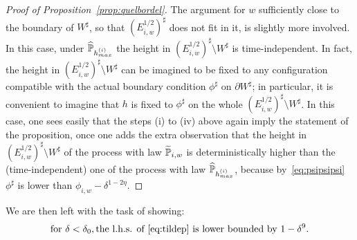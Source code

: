 \documentclass[10pt]{amsart}
\theoremstyle{definition}\newtheorem{defi}[theo]{Definition}\newtheorem{rema}[theo]{Remark}\newtheorem{exam}[theo]{Example}\newtheorem{exem}[theo]{Example}\newtheorem{nota}[theo]{Notation}
\renewcommand{\P}{\mathbb{P}}
\renewcommand{\d}{{\sharp }}
\let\oldtilde\tilde
\renewcommand*{\tilde}[1]{\mathchoice{\widetilde{#1}}{\widetilde{#1}}{\oldtilde{#1}}{\oldtilde{#1}}}
\let\oldhat\hat
\renewcommand*{\hat}[1]{\mathchoice{\widehat{#1}}{\widehat{#1}}{\oldhat{#1}}{\oldhat{#1}}}
\begin{document}
\begin{proof}[Proof of Proposition~\ref{prop:quelbordel}]
The argument for $w$ sufficiently close to the boundary of $W^\d$, so that $(E^{1/2}_{i,w})^\d$ does not fit in it, is slightly more involved. In this case, under $\hat\P_{h^{(i)}_{max}}$ the height in $(E^{1/2}_{i,w})^\d\setminus W^\d$ is time-independent. In fact, the height in $(E^{1/2}_{i,w})^\d\setminus W^\d$ can be imagined to be fixed to any configuration compatible with the actual boundary condition $\phi^\d$ on $\partial W^\d$; in particular, it is convenient to imagine that $h$ is fixed to $\phi^\d$ on the whole $(E^{1/2}_{i,w})^\d\setminus W^\d$. In this case, one sees easily that the steps (i) to (iv) above again imply the statement of the proposition, once one adds the extra observation that the height in $(E^{1/2}_{i,w})^\d\setminus W^\d$ of the process with law $\tilde \P_{i,w}$ is deterministically higher than the (time-independent) one of the process with law $\hat \P_{h^{(i)}_{max}}$, because by~\eqref{eq:psipsipsi} $\phi^\d$ is lower than $\phi_{i,w}-\delta^{1-2\eta}$.
\end{proof}

We are then left with the task of showing:
\begin{equation}\label{eq:leftto}
\text{for }\delta<\delta_0, \text{the l.h.s. of~\eqref{eq:tildep} is lower bounded by $1-\delta^9$.}
\end{equation}
\end{document}
